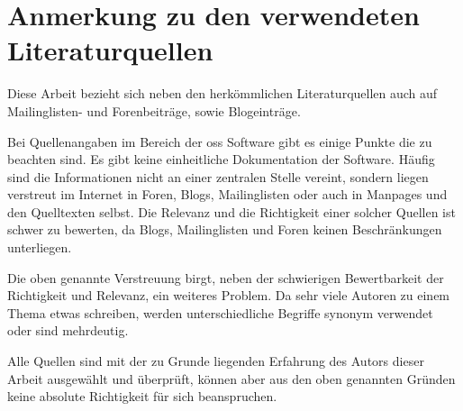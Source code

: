 \section{Anmerkung zu den verwendeten Literaturquellen}
Diese Arbeit bezieht sich neben den herkömmlichen Literaturquellen auch auf Mailinglisten- und Forenbeiträge, sowie Blogeinträge.

Bei Quellenangaben im Bereich der \gls{oss} Software gibt es einige Punkte die zu beachten sind. Es gibt keine einheitliche Dokumentation der Software. Häufig sind die Informationen nicht an einer zentralen Stelle vereint, sondern liegen verstreut im Internet in Foren, Blogs, Mailinglisten oder auch in Manpages und den Quelltexten selbst. Die Relevanz und die Richtigkeit einer solcher Quellen ist schwer zu bewerten, da Blogs, Mailinglisten und Foren keinen Beschränkungen unterliegen. \begin{comment} Das heißt, jeder der Willens ist zu einem Thema etwas zu schreiben, kann dies auch tun. \end{comment} 
\newpage
Die oben genannte Verstreuung birgt, neben der schwierigen Bewertbarkeit der Richtigkeit und Relevanz, ein weiteres Problem. Da sehr viele Autoren zu einem Thema etwas schreiben, werden unterschiedliche Begriffe synonym verwendet oder sind mehrdeutig.

Alle Quellen sind mit der zu Grunde liegenden Erfahrung des Autors dieser Arbeit ausgewählt und überprüft, können aber aus den oben genannten Gründen keine absolute Richtigkeit für sich beanspruchen.
